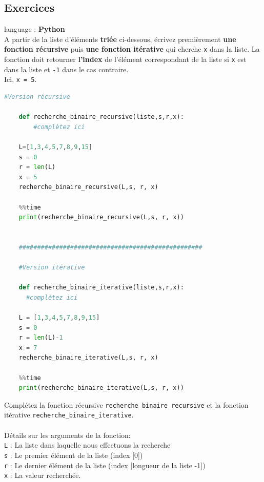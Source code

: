 \subsection{Exercices}

\begin{Exercice}[20 minutes] language : \textbf{Python}\\

A partir de la liste d'éléments \textbf{triée} ci-dessous, écrivez premièrement \textbf{une fonction récursive} puis \textbf{une fonction itérative} qui cherche \lstinline{x} dans la liste. La fonction doit retourner \textbf{l'index} de l'élément correspondant de la liste si \lstinline{x} est dans la liste et \lstinline{-1} dans le cas contraire.\\
Ici, \lstinline{x = 5}.\\

\begin{lstlisting}[language=Python]
    #Version récursive
    
    def recherche_binaire_recursive(liste,s,r,x):
        #complètez ici 
    
    L=[1,3,4,5,7,8,9,15]
    s = 0
    r = len(L)
    x = 5
    recherche_binaire_recursive(L,s, r, x)
 
    %%time
    print(recherche_binaire_recursive(L,s, r, x))

    
    ##################################################

    #Version itérative
    
    def recherche_binaire_iterative(liste,s,r,x):
      #complètez ici
      
    L = [1,3,4,5,7,8,9,15]
    s = 0
    r = len(L)-1
    x = 7
    recherche_binaire_iterative(L,s, r, x)
    
    %%time
    print(recherche_binaire_iterative(L,s, r, x))
\end{lstlisting}

    \begin{conseil}
        Complétez la fonction récursive \lstinline{recherche_binaire_recursive} et la fonction itérative \lstinline{recherche_binaire_iterative}.\\\\
        Détails sur les arguments de la fonction:\\
        \lstinline{L} : La liste dans laquelle nous effectuons la recherche\\
        \lstinline{s} : Le premier élément de la liste (index [0])\\
        \lstinline{r} : Le dernier élément de la liste (index [longueur de la liste -1])\\
        \lstinline{x} : La valeur recherchée.\\\\


\end{conseil}
\end{Exercice}
